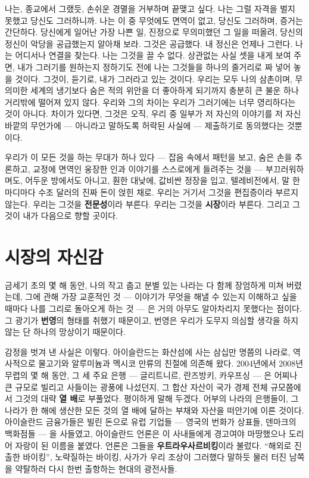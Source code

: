 나는, 종교에서 그랬듯, 손쉬운 경멸을 거부하며 끝맺고 싶다. 나는 그럴 자격을 벌지 못했고 당신도 그러하니까. 나는 이 중 무엇에도 면역이 없고, 당신도 그러하며, 증거는 간단하다. 당신에게 일어난 가장 나쁜 일, 진정으로 무의미했던 그 일을 떠올려, 당신의 정신이 악당을 공급했는지 알아채 보라. 그것은 공급했다. 내 정신은 언제나 그런다. 나는 어디서나 연결을 찾는다. 나는 그것을 끌 수 없다. 상관없는 사실 셋을 내게 보여 주면, 내가 그러기를 원하는지 정하기도 전에 나는 그것들을 하나의 줄거리로 짜 넣어 놓을 것이다. 그것이, 듣기로, 내가 그러라고 있는 것이다. 우리는 모두 나의 삼촌이며, 무의미한 세계의 냉기보다 숨은 적의 위안을 더 좋아하게 되기까지 충분히 큰 불운 하나 거리밖에 떨어져 있지 않다. 우리와 그의 차이는 우리가 그러기에는 너무 영리하다는 것이 아니다. 차이가 있다면, 그것은 오직, 우리 중 일부가 저 자신의 이야기를 저 자신 바깥의 무언가에 — 아니라고 말하도록 허락된 사실에 — 제출하기로 동의했다는 것뿐이다.

우리가 이 모든 것을 하는 무대가 하나 있다 — 잡음 속에서 패턴을 보고, 숨은 손을 추론하고, 교정에 면역인 웅장한 인과 이야기를 스스로에게 들려주는 것을 — 부끄러워하며도, 어두운 방에서도 아니고, 훤한 대낮에, 값비싼 정장을 입고, 텔레비전에서, 말 한마디마다 수조 달러의 진짜 돈이 얹힌 채로. 우리는 거기서 그것을 편집증이라 부르지 않는다. 우리는 그것을 \textbf{전문성}이라 부른다. 우리는 그것을 \textbf{시장}이라 부른다. 그리고 그것이 내가 다음으로 향할 곳이다.

\chapter{시장의 자신감}

금세기 초의 몇 해 동안, 나의 작고 춥고 분별 있는 나라는 다 함께 장엄하게 미쳐 버렸는데, 그에 관해 가장 교훈적인 것 — 이야기가 무엇을 해낼 수 있는지 이해하고 싶을 때마다 나를 그리로 돌아오게 하는 것 — 은 거의 아무도 알아차리지 못했다는 점이다. 그 광기가 \textbf{번영}의 형태를 취했기 때문이고, 번영은 우리가 도무지 의심할 생각을 하지 않는 단 하나의 망상이기 때문이다.

감정을 벗겨 낸 사실은 이렇다. 아이슬란드는 화산섬에 사는 삼십만 명쯤의 나라로, 역사적으로 물고기와 알루미늄과 멕시코 만류의 친절에 의존해 왔다. 2004년에서 2008년 무렵의 몇 해 동안, 그 세 주요 은행 — 글리트니르, 란즈방키, 카우프싱 — 은 어찌나 큰 규모로 빌리고 사들이는 광풍에 나섰던지, 그 합산 자산이 국가 경제 전체 규모쯤에서 그것의 대략 \textbf{열 배}로 부풀었다. 평이하게 말해 두겠다. 어부의 나라의 은행들이, 그 나라가 한 해에 생산한 모든 것의 열 배에 달하는 부채와 자산을 떠안기에 이른 것이다. 아이슬란드 금융가들은 빌린 돈으로 유럽 기업들 — 영국의 번화가 상표들, 덴마크의 백화점들 — 을 사들였고, 아이슬란드 언론은 이 사내들에게 경고여야 마땅했으나 도리어 자랑이 된 이름을 붙였다. 언론은 그들을 \textbf{우트라우사르비킹}이라 불렀다. ``해외로 진출한 바이킹'', 노략질하는 바이킹, 사가가 우리 조상이 그러했다 말하듯 물러 터진 남쪽을 약탈하러 다시 한번 출항하는 현대의 광전사들.

